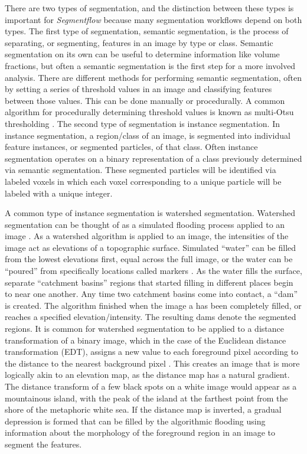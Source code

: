 There are two types of segmentation, and the distinction between these types
is important for \textit{Segmentflow} because many segmentation workflows
depend on both types.
The first type of segmentation, semantic segmentation, is the process of
separating, or segmenting, features in an image by type or class.
Semantic segmentation on its own can be useful to determine information
like volume fractions, but often a semantic segmentation is the first step
for a more involved analysis.
There are different methods for performing semantic segmentation,
often by setting a series of threshold values in an image
and classifying features between those values.
This can be done manually or procedurally. A common algorithm for
procedurally determining threshold values is
known as multi-Otsu thresholding \cite{Otsu1979}.
The second type of segmentation is instance segmentation.
In instance segmentation, a region/class of an image,
is segmented into individual feature
instances, or segmented particles, of that class.
Often instance segmentation operates on a binary
representation of a class previously determined via semantic segmentation.
These segmented particles will be identified via labeled
voxels in which each voxel corresponding to a unique particle will be
labeled with a unique integer.

A common type of instance segmentation
is watershed segmentation.
Watershed segmentation can be
thought of as a simulated flooding process applied to an image
\cite{Beucher1979,Beucher1992,Soille1990viscomm,Soille1990sigproc,Vincent1991}.
As a watershed algorithm is applied to an image, the intensities of the
image act as elevations of a topographic surface. Simulated ``water'' can be
filled from the lowest elevations first, equal across the full image,
or the water can be ``poured'' from specifically locations called markers
\cite{Moga1998,Parvati2008}. As the water fills the surface,
separate ``catchment basins'' regions that started filling in different
places begin to near one another. Any time two catchment basins come into
contact, a ``dam'' is created. The algorithm finished when the image a has
been completely filled, or reaches a specified elevation/intensity. The
resulting dams denote the segmented regions.
It is common for watershed segmentation to be
applied to a distance transformation of a binary image, which in the case
of the Euclidean distance transformation (EDT), assigns a new
value to each foreground pixel according to the distance to the nearest
background pixel \cite{Danielsson1980}. This creates an image that is more
logically akin to an elevation map, as the distance map has a natural
gradient. The distance transform of a few black spots on a white image
would appear as a mountainous island, with the peak of the island at the
farthest point from the shore of the metaphoric white sea. If the distance map
is inverted, a gradual depression is formed that can be filled by the
algorithmic flooding using information about the morphology of the
foreground region in an image to segment the features.

